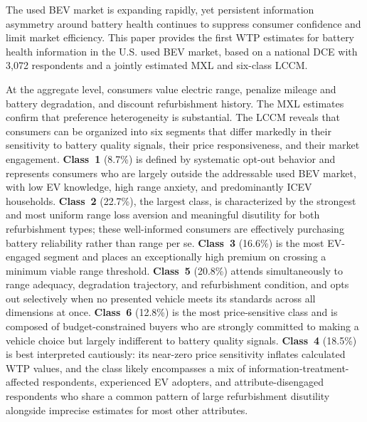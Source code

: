 \documentclass[a4paper,fleqn]{cas-sc}   %
\begin{document}
The used BEV market is expanding rapidly, yet persistent information asymmetry around battery health continues to suppress consumer confidence and limit market efficiency. This paper provides the first WTP estimates for battery health information in the U.S. used BEV market, based on a national DCE with 3,072 respondents and a jointly estimated MXL and six-class LCCM.

At the aggregate level, consumers value electric range, penalize mileage and battery degradation, and discount refurbishment history. The MXL estimates confirm that preference heterogeneity is substantial. The LCCM reveals that consumers can be organized into six segments that differ markedly in their sensitivity to battery quality signals, their price responsiveness, and their market engagement. \textbf{Class~1} (8.7\%) is defined by systematic opt-out behavior and represents consumers who are largely outside the addressable used BEV market, with low EV knowledge, high range anxiety, and predominantly ICEV households. \textbf{Class~2} (22.7\%), the largest class, is characterized by the strongest and most uniform range loss aversion and meaningful disutility for both refurbishment types; these well-informed consumers are effectively purchasing battery reliability rather than range per se. \textbf{Class~3} (16.6\%) is the most EV-engaged segment and places an exceptionally high premium on crossing a minimum viable range threshold. \textbf{Class~5} (20.8\%) attends simultaneously to range adequacy, degradation trajectory, and refurbishment condition, and opts out selectively when no presented vehicle meets its standards across all dimensions at once. \textbf{Class~6} (12.8\%) is the most price-sensitive class and is composed of budget-constrained buyers who are strongly committed to making a vehicle choice but largely indifferent to battery quality signals. \textbf{Class~4} (18.5\%) is best interpreted cautiously: its near-zero price sensitivity inflates calculated WTP values, and the class likely encompasses a mix of information-treatment-affected respondents, experienced EV adopters, and attribute-disengaged respondents who share a common pattern of large refurbishment disutility alongside imprecise estimates for most other attributes.
\end{document}

